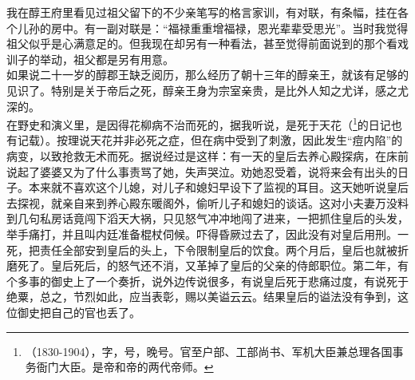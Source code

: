 我在醇王府里看见过祖父留下的不少亲笔写的格言家训，有对联，有条幅，挂在各个儿孙的房中。有一副对联是：“福禄重重增福禄，恩光辈辈受思光”。当时我觉得祖父似乎是心满意足的。但我现在却另有一种看法，甚至觉得前面说到的那个看戏训子的举动，祖父都是另有用意。\\

如果说二十一岁的醇郡王缺乏阅历，那么经历了朝十三年的醇亲王，就该有足够的见识了。特别是关于帝后之死，醇亲王身为宗室亲贵，是比外人知之尤详，感之尤深的。\\

在野史和演义里，是因得花柳病不治而死的，据我听说，是死于天花（\footnote{（1830-1904），字，号，晚号。官至户部、工部尚书、军机大臣兼总理各国事务衙门大臣。是帝和帝的两代帝师。}的日记也有记载）。按理说天花并非必死之症，但在病中受到了刺激，因此发生“痘内陷”的病变，以致抢救无术而死。据说经过是这样：有一天的皇后去养心殿探病，在床前说起了婆婆又为了什么事责骂了她，失声哭泣。劝她忍受着，说将来会有出头的日子。本来就不喜欢这个儿媳，对儿子和媳妇早设下了监视的耳目。这天她听说皇后去探视，就亲自来到养心殿东暖阁外，偷听儿子和媳妇的谈话。这对小夫妻万没料到几句私房话竟闯下滔天大祸，只见怒气冲冲地闯了进来，一把抓住皇后的头发，举手痛打，并且叫内廷准备棍杖伺候。吓得昏厥过去了，因此没有对皇后用刑。一死，把责任全部安到皇后的头上，下令限制皇后的饮食。两个月后，皇后也就被折磨死了。皇后死后，的怒气还不消，又革掉了皇后的父亲的侍郎职位。第二年，有个多事的御史上了一个奏折，说外边传说很多，有说皇后死于悲痛过度，有说死于绝粟，总之，节烈如此，应当表彰，赐以美谥云云。结果皇后的谥法没有争到，这位御史把自己的官也丢了。\\

